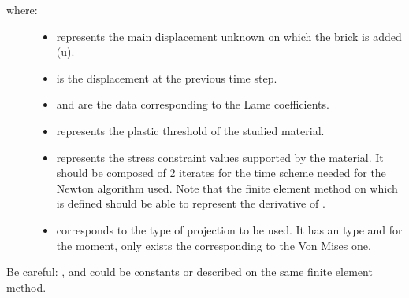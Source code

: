 \documentclass[a4paper,11pt,english]{sphinxmanual}
\begin{document}
\begin{sphinxVerbatim}[commandchars=\\\{\}]
             
\end{sphinxVerbatim}
\begin{description}
\item[{where:}] \leavevmode\begin{itemize}
\item {} 
 represents the main displacement unknown on which the brick is added (u).

\item {} 
 is the displacement at the previous time step.

\item {} 
 and  are the data corresponding to the Lame coefficients.

\item {} 
 represents the plastic threshold of the studied material.

\item {} 
 represents the stress constraint values supported by the material. It should be composed of 2 iterates for the time scheme needed for the Newton algorithm used. Note that the finite element method on which  is defined should be able to represent the derivative of .

\item {} 
 corresponds to the type of projection to be used. It has an  type and for the moment, only exists the  corresponding to the Von Mises one.

\end{itemize}

\end{description}

Be careful: ,  and  could be constants or described on the same finite element method.
\end{document}
